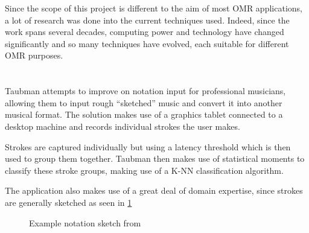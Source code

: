 Since the scope of this project is different to the aim of most OMR applications, a lot of research was done into the current techniques used. Indeed, since the work spans several decades, computing power and technology have changed significantly and so many techniques have evolved, each suitable for different OMR purposes.

\section {\cite{taubman2005musichand}}

Taubman attempts to improve on notation input for professional musicians, allowing them to input rough ``sketched'' music and convert it into another musical format. The solution makes use of a graphics tablet connected to a desktop machine and records individual strokes the user makes.

Strokes are captured individually but using a latency threshold which is then used to group them together. Taubman then makes use of statistical moments  to classify these stroke groups, making use of a K-NN classification algorithm.

The application also makes use of a great deal of domain expertise, since strokes are generally sketched as seen in \ref{fig:taubman-sketch}

\begin{figure}[h!]
  \centering
  \caption{Example notation sketch from \cite{taubman2005musichand}}
  \label{fig:taubman-sketch}
\end{figure}
